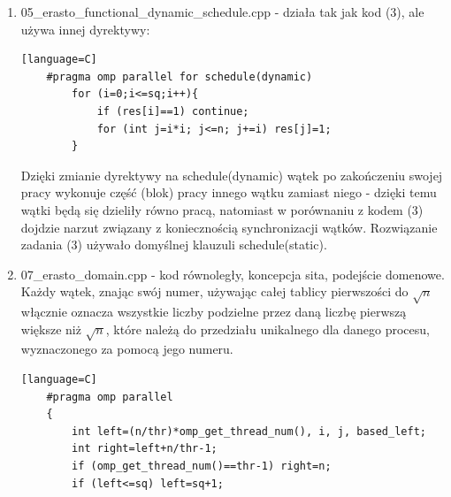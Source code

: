 \documentclass[12pt]{article}
\begin{document}
\begin {enumerate}
\begin{lstlisting}[style=mystyle, caption=  Ręczny scheduling sita funkcyjnego][language=C]
	int beg=0, end=sq;
	double partsum=0;
	for (i=0;i<proc;i++){
		ij[i]=0;
		partsum=0;
		for (j=beg;j<=end;j++){
			if (res[j]==0) {
				squarez[i][ij[i]]=j, partsum+=1.0/j, ij[i]++;
				break;
			}
		}
		beg=j+1;
		if (partsum<part){
			for (j=end;j>=beg;j--){
				if (res[j]==0) {
					squarez[i][ij[i]]=j, partsum+=1.0/j, ij[i]++;
				}
				if (partsum>=part) break;
			}
			end=j-1;
		}
	}
	\end{lstlisting}
	Dzięki powyższemu rozwiążę problem przedstawiony w części (a) poprzedniego rozwiązania - procesy będą względnie równo dzielić się pracą bez dodatkowego narzutu związanego z synchronizacją, przy czym procesy, które wezmą najniższe liczby pierwsze (2, 3, czasem 5) nadal wykonałyby największą pracę, ponieważ dla \(n<500000000 \land proc=4\) nadal zachodzi \(\frac{1}{2}\ge psum)\) - Analogicznie dla 3. Problemem z tą heurystyką jest nieuwzględnienie cache missów: odznaczanie liczb złożonych za pomocą liczby 2 będzie miało dużo rzadziej cache missa niż odznacznie liczb złożonych za pomocą za pomocą liczby 8387, a następnie kolejnych 10 liczb pierwszych, za każdym razem wymieniając dane w cache. Pozostałe części rozwiązania - (b), (c), (d) są identyczne dla tego kodu.
	\item 05\_erasto\_functional\_dynamic\_schedule.cpp - działa tak jak kod (3), ale używa innej dyrektywy:
	\begin{lstlisting}[style=mystyle, caption= Sito funkcyjne z dynamic schedulingiem][language=C]
	#pragma omp parallel for schedule(dynamic)
		for (i=0;i<=sq;i++){
			if (res[i]==1) continue;
			for (int j=i*i; j<=n; j+=i) res[j]=1;
		}
	\end{lstlisting}
	Dzięki zmianie dyrektywy na schedule(dynamic) wątek po zakończeniu swojej pracy wykonuje część (blok) pracy innego wątku zamiast niego - dzięki temu wątki będą się dzieliły równo pracą, natomiast w porównaniu z kodem (3) dojdzie narzut związany z koniecznością synchronizacji wątków. Rozwiązanie zadania (3) używało domyślnej klauzuli schedule(static).
	\item 07\_erasto\_domain.cpp - kod równoległy, koncepcja sita, podejście domenowe. Każdy wątek, znając swój numer, używając całej tablicy pierwszości do \(\sqrt{n}\) włącznie oznacza wszystkie liczby podzielne przez daną liczbę pierwszą większe niż \(\sqrt{n}\), które należą do przedziału unikalnego dla danego procesu, wyznaczonego za pomocą jego numeru.
	\begin{lstlisting}[style=mystyle, caption= Sito funkcyjne z dynamic schedulingiem][language=C]
	#pragma omp parallel
	{
		int left=(n/thr)*omp_get_thread_num(), i, j, based_left;
		int right=left+n/thr-1;
		if (omp_get_thread_num()==thr-1) right=n;
		if (left<=sq) left=sq+1;
		

\end{lstlisting}
\end{enumerate}
\end{document}

